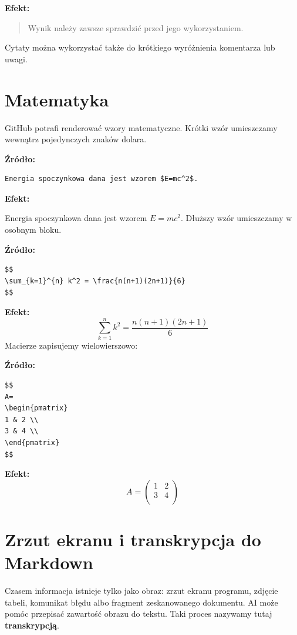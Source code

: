 \documentclass[12pt, a4paper]{article}
\begin{document}
\textbf{Efekt:}
\begin{quote}
Wynik należy zawsze sprawdzić przed jego wykorzystaniem.
\end{quote}

Cytaty można wykorzystać także do krótkiego wyróżnienia komentarza lub uwagi.

\section{Matematyka}
GitHub potrafi renderować wzory matematyczne. Krótki wzór umieszczamy wewnątrz pojedynczych znaków dolara.

\textbf{Źródło:}
\begin{lstlisting}
Energia spoczynkowa dana jest wzorem $E=mc^2$.    
\end{lstlisting}
\textbf{Efekt:}

Energia spoczynkowa dana jest wzorem $E=mc^2$. Dłuższy wzór umieszczamy w osobnym bloku.

\textbf{Źródło:}
\begin{lstlisting}
$$
\sum_{k=1}^{n} k^2 = \frac{n(n+1)(2n+1)}{6}
$$
\end{lstlisting}

\textbf{Efekt:}
$$\sum_{k=1}^{n} k^2 = \frac{n(n+1)(2n+1)}{6}$$
Macierze zapisujemy wielowierszowo:

\textbf{Źródło:}
\begin{lstlisting}
$$
A= 
\begin{pmatrix} 
1 & 2 \\ 
3 & 4 \\ 
\end{pmatrix}
$$
\end{lstlisting}

\textbf{Efekt:}
$$A= \begin{pmatrix} 1 & 2 \\ 3 & 4 \\ \end{pmatrix}$$

\section{Zrzut ekranu i transkrypcja do Markdown}
Czasem informacja istnieje tylko jako obraz: zrzut ekranu programu, zdjęcie tabeli, komunikat błędu albo fragment zeskanowanego dokumentu. AI może pomóc przepisać zawartość obrazu do tekstu. Taki proces nazywamy tutaj \textbf{transkrypcją}. 
\end{document}
